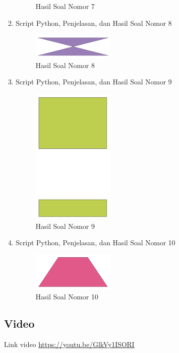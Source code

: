 \begin{enumerate}
\begin{figure}[H]
		\centering
		\caption{Hasil Soal Nomor 7}
	\end{figure}
	\item Script Python, Penjelasan, dan Hasil Soal Nomor 8
	
	\begin{figure}[H]
		\includegraphics[width=4cm]{figures/1174006/2/8.png}
		\centering
		\caption{Hasil Soal Nomor 8}
	\end{figure}
	\item Script Python, Penjelasan, dan Hasil Soal Nomor 9
	
	\begin{figure}[H]
		\includegraphics[width=4cm]{figures/1174006/2/9.png}
		\centering
		\caption{Hasil Soal Nomor 9}
	\end{figure}
	\item Script Python, Penjelasan, dan Hasil Soal Nomor 10
	
	\begin{figure}[H]
		\includegraphics[width=4cm]{figures/1174006/2/10.png}
		\centering
		\caption{Hasil Soal Nomor 10}
	\end{figure}
\end{enumerate}
\subsection{Video}
Link video \href{https://youtu.be/GlkVy1ISORI}{https://youtu.be/GlkVy1ISORI}
